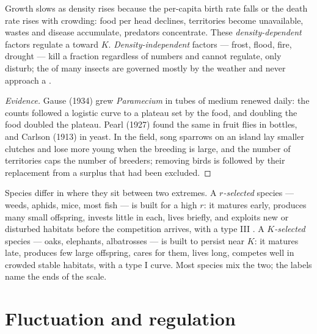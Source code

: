 \begin{proposition}\label{prop:b1:populations:densitydependence}
Growth slows as density rises because the per-capita birth rate falls
or the death rate rises with crowding: food per head declines,
territories become unavailable, wastes and disease accumulate,
predators concentrate. These \emph{density-dependent} factors regulate
a  toward $K$. \emph{Density-independent} factors --- frost,
flood, fire, drought --- kill a fraction regardless of numbers and
cannot regulate, only disturb; the  of many insects are
governed mostly by the weather and never approach a .
\end{proposition}
\begin{proof}[Evidence]
Gause (1934) grew \emph{Paramecium} in tubes of medium renewed daily:
the counts followed a logistic curve to a plateau set by the food,
and doubling the food doubled the plateau. Pearl (1927) found the same
in fruit flies in bottles, and Carlson (1913) in yeast. In the field,
song sparrows on an island lay smaller clutches and lose more young
when the breeding  is large, and the number of territories
caps the number of breeders; removing birds is followed by their
replacement from a surplus that had been excluded.
\end{proof}

\begin{definition}\label{def:b1:populations:rK}
Species differ in where they sit between two extremes. A
\emph{$r$-selected} species --- weeds, aphids, mice, most fish --- is
built for a high $r$: it matures early, produces many small offspring,
invests little in each, lives briefly, and exploits new or disturbed
habitats before the competition arrives, with a type III .
A \emph{$K$-selected} species --- oaks, elephants, albatrosses ---
is built to persist near $K$: it matures late, produces few large
offspring, cares for them, lives long, competes well in crowded
stable habitats, with a type I curve. Most species mix the two; the
labels name the ends of the scale.
\end{definition}

\section{Fluctuation and regulation}

